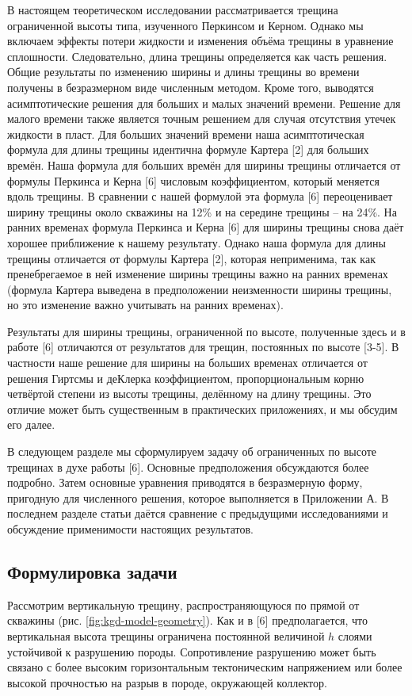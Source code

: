 \documentclass[a4paper, 11pt]{article}
\begin{document}
В настоящем теоретическом исследовании рассматривается трещина ограниченной высоты типа, изученного Перкинсом и Керном.
Однако мы включаем эффекты потери жидкости и изменения объёма трещины в уравнение сплошности.
Следовательно, длина трещины определяется как часть решения.
Общие результаты по изменению ширины и длины трещины во времени получены в безразмерном виде численным методом.
Кроме того, выводятся асимптотические решения для больших и малых значений времени.
Решение для малого времени также является точным решением для случая отсутствия утечек жидкости в пласт.
Для больших значений времени наша асимптотическая формула для длины трещины идентична формуле Картера [2] для больших времён.
Наша формула для больших времён для ширины трещины отличается от формулы Перкинса и Керна [6] числовым коэффициентом, который меняется вдоль трещины.
В сравнении с нашей формулой эта формула [6] переоценивает ширину трещины около скважины на 12\% и на середине трещины -- на 24\%. 
На ранних временах формула Перкинса и Керна [6] для ширины трещины снова даёт хорошее приближение к нашему результату.
Однако наша формула для длины трещины отличается от формулы Картера [2], которая неприменима, так как пренебрегаемое в ней изменение ширины трещины важно на ранних временах (формула Картера выведена в предположении неизменности ширины трещины, но это изменение важно учитывать на ранних временах).

Результаты для ширины трещины, ограниченной по высоте, полученные здесь и в работе [6] отличаются от результатов для трещин, постоянных по высоте [3-5].
В частности наше решение для ширины на больших временах отличается от решения Гиртсмы и деКлерка коэффициентом, пропорциональным корню четвёртой степени из высоты трещины, делённому на длину трещины.
Это отличие может быть существенным в практических приложениях, и мы обсудим его далее.

В следующем разделе мы сформулируем задачу об ограниченных по высоте трещинах в духе работы [6].
Основные предположения обсуждаются более подробно.
Затем основные уравнения приводятся в безразмерную форму, пригодную для численного решения, которое выполняется в Приложении А.
В последнем разделе статьи даётся сравнение с предыдущими исследованиями и обсуждение применимости настоящих результатов.

\subsection{Формулировка задачи}

Рассмотрим вертикальную трещину, распространяющуюся по прямой от скважины (рис. \ref{fig:kgd-model-geometry}).
Как и в [6] предполагается, что вертикальная высота трещины ограничена постоянной величиной $h$ слоями устойчивой к разрушению породы.
Сопротивление разрушению может быть связано с более высоким горизонтальным тектоническим напряжением или более высокой прочностью на разрыв в породе, окружающей коллектор.
\end{document}
